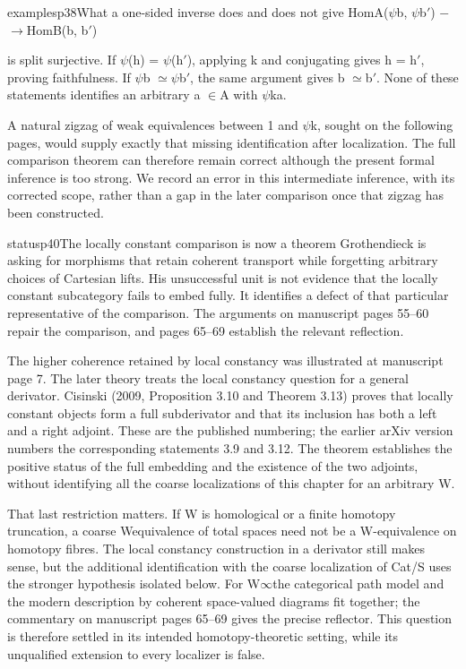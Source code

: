 \begin{dcomment}{examples}{p38}{What a one-sided inverse does and does not give}
HomA(\ensuremath{\psi}b, \ensuremath{\psi}b\ensuremath{\prime}) \ensuremath{-}\ensuremath{\to}HomB(b, b\ensuremath{\prime})

is split surjective. If \ensuremath{\psi}(h) = \ensuremath{\psi}(h\ensuremath{\prime}), applying k and conjugating gives h = h\ensuremath{\prime}, proving faithfulness. If \ensuremath{\psi}b \ensuremath{\simeq}\ensuremath{\psi}b\ensuremath{\prime}, the same argument gives b \ensuremath{\simeq}b\ensuremath{\prime}. None of these statements identifies an arbitrary a \ensuremath{\in}A with \ensuremath{\psi}ka.

A natural zigzag of weak equivalences between 1 and \ensuremath{\psi}k, sought on the following pages, would supply exactly that missing identification after localization. The full comparison theorem can therefore remain correct although the present formal inference is too strong. We record an error in this intermediate inference, with its corrected scope, rather than a gap in the later comparison once that zigzag has been constructed.

\end{dcomment}

\begin{dcomment}{status}{p40}{The locally constant comparison is now a theorem}
Grothendieck is asking for morphisms that retain coherent transport while forgetting arbitrary choices of Cartesian lifts. His unsuccessful unit is not evidence that the locally constant subcategory fails to embed fully. It identifies a defect of that particular representative of the comparison. The arguments on manuscript pages 55--60 repair the comparison, and pages 65--69 establish the relevant reflection.

The higher coherence retained by local constancy was illustrated at manuscript page 7. The later theory treats the local constancy question for a general derivator. Cisinski (2009, Proposition 3.10 and Theorem 3.13) proves that locally constant objects form a full subderivator and that its inclusion has both a left and a right adjoint. These are the published numbering; the earlier arXiv version numbers the corresponding statements 3.9 and 3.12. The theorem establishes the positive status of the full embedding and the existence of the two adjoints, without identifying all the coarse localizations of this chapter for an arbitrary W.

That last restriction matters. If W is homological or a finite homotopy truncation, a coarse Wequivalence of total spaces need not be a W-equivalence on homotopy fibres. The local constancy construction in a derivator still makes sense, but the additional identification with the coarse localization of Cat/S uses the stronger hypothesis isolated below. For W\ensuremath{\infty}the categorical path model and the modern description by coherent space-valued diagrams fit together; the commentary on manuscript pages 65--69 gives the precise reflector. This question is therefore settled in its intended homotopy-theoretic setting, while its unqualified extension to every localizer is false.

\end{dcomment}

